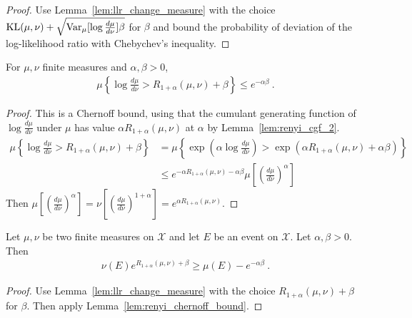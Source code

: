 \begin{proof}%
{}
Use Lemma~\ref{lem:llr_change_measure} with the choice $\operatorname{KL}(\mu, \nu) + \sqrt{\operatorname{Var}_\mu[\log\frac{d \mu}{d \nu}]\beta}$ for $\beta$ and bound the probability of deviation of the log-likelihood ratio with Chebychev's inequality.
\end{proof}

\begin{lemma}
  \label{lem:renyi_chernoff_bound}
  \leanok
  For $\mu, \nu$ finite measures and $\alpha, \beta > 0$,
  \begin{align*}
  \mu\left\{ \log\frac{d \mu}{d \nu} > R_{1+\alpha}(\mu, \nu) + \beta \right\}
  \le e^{- \alpha \beta}
  \: .
  \end{align*}
\end{lemma}

\begin{proof}\leanok
{}
This is a Chernoff bound, using that the cumulant generating function of $\log\frac{d\mu}{d\nu}$ under $\mu$ has value $\alpha R_{1+\alpha}(\mu, \nu)$ at $\alpha$ by Lemma~\ref{lem:renyi_cgf_2}.
\begin{align*}
\mu\left\{ \log\frac{d \mu}{d \nu} > R_{1+\alpha}(\mu, \nu) + \beta \right\}
&= \mu\left\{ \exp\left(\alpha\log\frac{d \mu}{d \nu}\right) > \exp\left(\alpha R_{1+\alpha}(\mu, \nu) + \alpha \beta\right) \right\}
\\
&\le e^{-\alpha R_{1+\alpha}(\mu, \nu) - \alpha \beta} \mu\left[\left(\frac{d \mu}{d \nu}\right)^\alpha \right]
\end{align*}
Then $\mu\left[\left(\frac{d \mu}{d \nu}\right)^\alpha \right] = \nu\left[\left(\frac{d \mu}{d \nu}\right)^{1+\alpha} \right] = e^{\alpha R_{1+\alpha}(\mu, \nu)}$.
\end{proof}

\begin{lemma}
  \label{lem:renyi_change_measure}
  \leanok
  Let $\mu, \nu$ be two finite measures on $\mathcal X$ and let $E$ be an event on $\mathcal X$. Let $\alpha,\beta > 0$. Then
  \begin{align*}
  \nu(E) e^{R_{1+\alpha}(\mu, \nu) + \beta} \ge \mu(E) - e^{-\alpha \beta} \: .
  \end{align*}
\end{lemma}

\begin{proof}\leanok
{}
Use Lemma~\ref{lem:llr_change_measure} with the choice $R_{1+\alpha}(\mu, \nu) + \beta$ for $\beta$. Then apply Lemma~\ref{lem:renyi_chernoff_bound}.
\end{proof}


